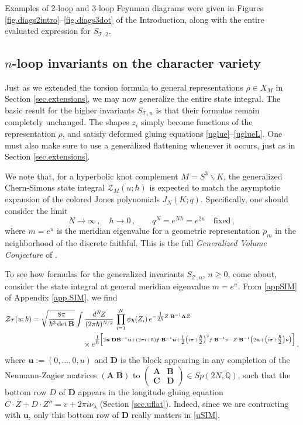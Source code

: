 \documentclass[12pt]{amsart}
\renewcommand{\eta}{\nu}
\theoremstyle{definition}
\def\be{  \begin{equation} }
\def\ee{  \end{equation} }
\newcommand{\CZ}{\mathcal{Z}}
\newcommand{\CT}{\mathcal{T}}
\newcommand{\mb}{\mathbf}
\numberwithin{equation}{section}
\begin{document}
Examples of 2-loop and 3-loop Feynman diagrams were given in Figures \ref{fig.diags2intro}--\ref{fig.diags3dot} of the Introduction, along with the entire evaluated expression for $S_{\CT,2}$.




\subsection{$n$-loop invariants on the character variety}
\label{sec.uSIM}

Just as we extended the torsion formula to general representations $\rho\in X_M$ in Section \ref{sec.extensions}, we may now generalize the entire state integral. The basic result for the higher invariants $S_{\CT,n}$ is that their formulas remain completely unchanged. The shapes $z_i$ simply become functions of the representation $\rho$, and satisfy deformed gluing equations \eqref{uglue}--\eqref{uglueL}. One must also make sure to use a generalized flattening whenever it occurs, just as in Section \ref{sec.extensions}.

We note that, for a hyperbolic knot complement $M=S^3\backslash K$, the generalized Chern-Simons state integral $\CZ_M(u;\hbar)$ is expected to match the asymptotic expansion of the colored Jones polynomials $J_N(K;q)$. Specifically, one should consider the limit
%
\be N\to \infty\,,\quad \hbar\to 0\,,\qquad q^N=e^{N\hbar}=e^{2u}\quad\text{fixed}\,,\ee
%
where $m=e^u$ is the meridian eigenvalue for a geometric representation $\rho_m$ in the neighborhood of the discrete faithful. This is the full \emph{Generalized Volume Conjecture} of \cite{Gu}.


To see how formulas for the generalized invariants $S_{\CT,n}$, $n\geq 0$, come about, consider the state integral at general meridian eigenvalue $m=e^u$. From \eqref{appSIM} of Appendix \ref{app.SIM}, we find
%
\begin{align} \notag
\CZ_\CT(u;\hbar) 
&=  \sqrt{\frac{8\pi}{\hbar^3\det\mb B}}\int \frac{d^N\!Z}{(2\pi \hbar)^{N/2}} \, \prod_{i=1}^N \psi_\hbar(Z_i)\,e^{-\tfrac1{2\hbar}Z\cdot \mb B^{-1}\mb A Z}\\
 &\hspace{1in} \times
e^{\tfrac1\hbar\Big[
2 \bm u\cdot \mb D\mb B^{-1}\bm u+(2\pi i+\hbar)f\cdot 
\mb B^{-1}\bm u
+\tfrac12\big(i\pi+\tfrac\hbar2\big)^2 f\cdot \mb B^{-1} \eta 
- Z\cdot\mb B^{-1}\big(2\bm u+\big(i\pi+\tfrac\hbar2\big)\eta\big)\Big]}    \,,
 \label{uSIM}
\end{align}
%
where $\bm u:=(0,...,0,u)$ and $\mb D$ is the block appearing in any completion of the Neumann-Zagier matrices $(\mb A\;\mb B)$ to $\left(\begin{smallmatrix}\mb A&\mb B\\\mb C&\mb D\end{smallmatrix}\right)\in Sp(2N,\mathbb{Q})$, such that the bottom row $D$ of $\mb D$ appears in the longitude gluing equation $C\cdot Z+D\cdot Z''=v+2\pi i\nu_\lambda$ (Section \ref{sec.uflat}). Indeed, since we are contracting with $\bm u$, only this bottom row of $\mb D$ really matters in \eqref{uSIM}.
\end{document}
